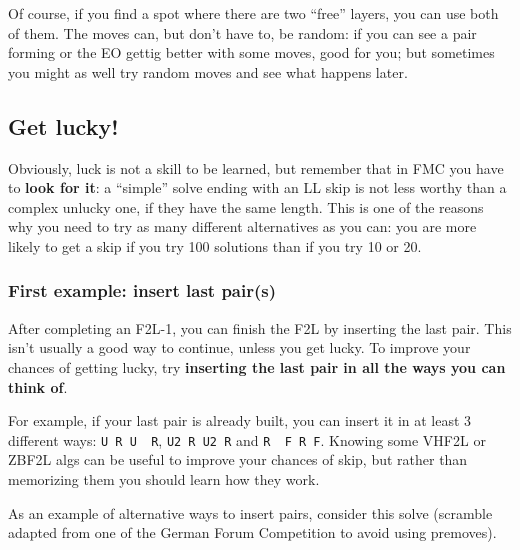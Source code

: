 \documentclass[11pt,a4paper]{book}
\newcommand{\p}{\textquotesingle}
\newcommand{\m}{\texttt}
\newcommand{\ps}{\p\,\,}
\begin{document}
Of course, if you find a spot where there are two ``free'' layers, you can use both of them. The moves can, but don't have to, be random: if you can see a pair forming or the EO gettig better with some moves, good for you; but sometimes you might as well try random moves and see what happens later.

\subsection{Get lucky!}

Obviously, luck is not a skill to be learned, but remember that in FMC you have to \textbf{look for it}: a ``simple'' solve ending with an LL skip is not less worthy than a complex unlucky one, if they have the same length. This is one of the reasons why you need to try as many different alternatives as you can: you are more likely to get a skip if you try 100 solutions than if you try 10 or 20.

\subsubsection{First example: insert last pair(s)}
\label{insert_pairs}

After completing an F2L-1, you can finish the F2L by inserting the last pair. This isn't usually a good way to continue, unless you get lucky. To improve your chances of getting lucky, try \textbf{inserting the last pair in all the ways you can think of}.

For example, if your last pair is already built, you can insert it in at least 3 different ways: \m{U R U\ps R\p}, \m{U2 R U2 R\p} and \m{R\ps F R F\p}. Knowing some VHF2L or ZBF2L algs can be useful to improve your chances of skip, but rather than memorizing them you should learn how they work.

As an example of alternative ways to insert pairs, consider this solve (scramble adapted from one of the German Forum Competition to avoid using premoves).
\end{document}
